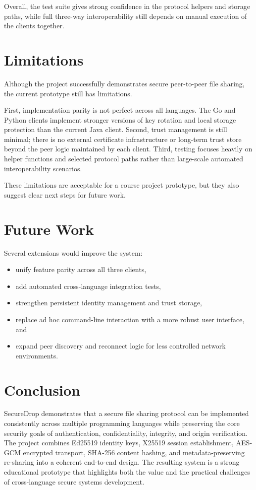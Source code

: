 \documentclass[sigconf,nonacm]{acmart}
\begin{document}
Overall, the test suite gives strong confidence in the protocol helpers
and storage paths, while full three-way interoperability still depends on
manual execution of the clients together.

\section{Limitations}
Although the project successfully demonstrates secure peer-to-peer file
sharing, the current prototype still has limitations.

First, implementation parity is not perfect across all languages. The Go
and Python clients implement stronger versions of key rotation and local
storage protection than the current Java client. Second, trust management
is still minimal; there is no external certificate infrastructure or
long-term trust store beyond the peer logic maintained by each client.
Third, testing focuses heavily on helper functions and selected protocol
paths rather than large-scale automated interoperability scenarios.

These limitations are acceptable for a course project prototype, but they
also suggest clear next steps for future work.

\section{Future Work}
Several extensions would improve the system:
\begin{itemize}
\item unify feature parity across all three clients,
\item add automated cross-language integration tests,
\item strengthen persistent identity management and trust storage,
\item replace ad hoc command-line interaction with a more robust user
interface, and
\item expand peer discovery and reconnect logic for less controlled
network environments.
\end{itemize}

\section{Conclusion}
SecureDrop demonstrates that a secure file sharing protocol can be
implemented consistently across multiple programming languages while
preserving the core security goals of authentication, confidentiality,
integrity, and origin verification. The project combines Ed25519 identity
keys, X25519 session establishment, AES-GCM encrypted transport, SHA-256
content hashing, and metadata-preserving re-sharing into a coherent
end-to-end design. The resulting system is a strong educational prototype
that highlights both the value and the practical challenges of
cross-language secure systems development.
\end{document}

